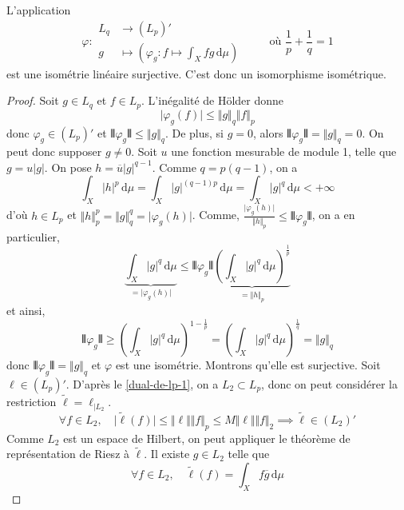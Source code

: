 
	\begin{theorem}
		L'application
		\[
		\varphi :
		\begin{array}{ll}
			L_q &\rightarrow (L_p)' \\
			g &\mapsto \left( \varphi_g : f \mapsto \int_X f g \, \mathrm{d}\mu \right)
		\end{array}
		\qquad \text{ où } \frac{1}{p} + \frac{1}{q} = 1
		\]
		est une isométrie linéaire surjective. C'est donc un isomorphisme isométrique.
	\end{theorem}

	\begin{proof}
		Soit $g \in L_q$ et $f \in L_p$. L'inégalité de Hölder donne
		\[ \vert \varphi_g(f) \vert \leq \Vert g \Vert_q \Vert f \Vert_p \]
		donc $\varphi_g \in (L_p)'$ et $\VERT \varphi_g \VERT \leq \Vert g \Vert_q$. De plus, si $g = 0$, alors $\VERT \varphi_g \VERT = \Vert g \Vert_q = 0$. On peut donc supposer $g \neq 0$.
		\newpar
	 	Soit $u$ une fonction mesurable de module 1, telle que $g = u \vert g \vert$. On pose $h = \overline{u} \vert g \vert^{q-1}$. Comme $q = p(q-1)$, on a
		\[ \int_X \vert h \vert^p \, \mathrm{d}\mu = \int_X \vert g \vert^{(q-1)p} \, \mathrm{d}\mu = \int_X \vert g \vert^{q} \, \mathrm{d}\mu < + \infty \]
		d'où $h \in L_p$ et $\Vert h \Vert_p^p = \Vert g \Vert_q^q = \vert \varphi_g(h) \vert$. Comme, $\frac{\vert \varphi_g(h) \vert}{\Vert h \Vert_p} \leq \VERT \varphi_g \VERT$, on a en particulier,
		\[ \underbrace{\int_X \vert g \vert^{q} \, \mathrm{d}\mu}_{= \vert \varphi_g(h) \vert} \leq \VERT \varphi_g \VERT \underbrace{\left ( \int_X \vert g \vert^{q} \, \mathrm{d}\mu \right )^{\frac{1}{p}}}_{= \Vert h \Vert_p} \]
		et ainsi,
		\[ \VERT \varphi_g \VERT \geq \left ( \int_X \vert g \vert^{q} \, \mathrm{d}\mu \right )^{1 - \frac{1}{p}} = \left ( \int_X \vert g \vert^{q} \, \mathrm{d}\mu \right )^{\frac{1}{q}} = \Vert g \Vert_q \]
		donc $\VERT \varphi_g \VERT = \Vert g \Vert_q$ et $\varphi$ est une isométrie.
		\newpar
		Montrons qu'elle est surjective. Soit $\ell \in (L_p)'$. D'après le \cref{dual-de-lp-1}, on a $L_2 \subset L_p$, donc on peut considérer la restriction $\widetilde{\ell} = \ell_{| L_2}$.
		\[ \forall f \in L_2, \quad \vert \widetilde{\ell}(f) \vert \leq \Vert \ell \Vert \Vert f \Vert_p \leq M \Vert \ell \Vert \Vert f \Vert_2 \implies \widetilde{\ell} \in (L_2)' \]
		Comme $L_2$ est un espace de Hilbert, on peut appliquer le théorème de représentation de Riesz à $\widetilde{\ell}$. Il existe $g \in L_2$ telle que
		\[ \forall f \in L_2, \quad \widetilde{\ell}(f) = \int_X f \overline{g} \, \mathrm{d}\mu \]

\end{proof}
